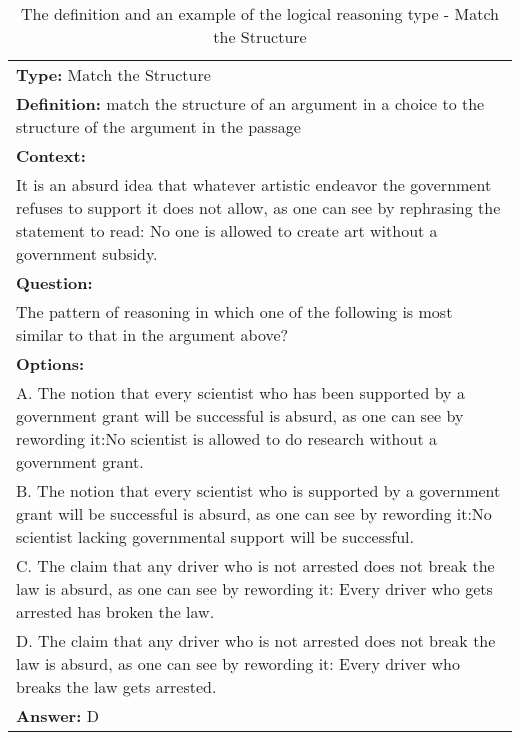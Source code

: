 \documentclass{article} \usepackage{iclr2020_conference,times}
\begin{document}
\begin{table}
	\small
	\centering
	\caption{The definition and an example of the logical reasoning type - Match the Structure}
	\begin{tabular}{|p{}|}
		\hline
		{\bf Type: }Match the Structure \\
		
		{\bf Definition: }match the structure of an argument in a choice to the structure of the argument in the passage
		\\
		\hline
		{\bf Context:} \\It is an absurd idea that whatever artistic endeavor the government refuses to support it does not allow, as one can see by rephrasing the statement to read: No one is allowed to create art without a government subsidy.
		\\
		{\bf Question:}\\The pattern of reasoning in which one of the following is most similar to that in the argument above?\\
		{\bf Options:}\\
			A. The notion that every scientist who has been supported by a government grant will be successful is absurd, as one can see by rewording it:No scientist is allowed to do research without a government grant.\\
			B. The notion that every scientist who is supported by a government grant will be successful is absurd, as one can see by rewording it:No scientist lacking governmental support will be successful.\\
			C. The claim that any driver who is not arrested does not break the law is absurd, as one can see by rewording it: Every driver who gets arrested has broken the law.\\
			D. The claim that any driver who is not arrested does not break the law is absurd, as one can see by rewording it: Every driver who breaks the law gets arrested.\\
		{\bf Answer: } D\\
		\hline
	\end{tabular}
	\label{tab:match-the-structure}
\end{table}
\end{document}
